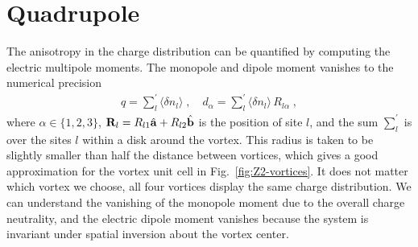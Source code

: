 






\section{Quadrupole}

The anisotropy in the charge distribution can be quantified by computing the electric multipole moments.
The monopole and dipole moment vanishes to the numerical precision
\begin{eqnarray}
    q= \sum_{l}^\prime \langle \delta n_l\rangle \; , \quad
    d_\alpha =  \sum_{l}^\prime \langle \delta n_l\rangle \, {R}_{l\alpha} \;  ,
\end{eqnarray}
where $\alpha\in \{1,2,3\}$, $\mathbf R_l= R_{l1}\hat{\mathbf a}+R_{l2}\hat{\mathbf b}$ is the position of site $l$, and the sum $\sum_{l}^\prime$ is over the sites $l$ within a disk around the vortex. This radius is taken to be slightly smaller than half the distance between vortices, which gives a good approximation for the vortex unit cell in Fig.~\ref{fig:Z2-vortices}.
It does not matter which vortex we choose, all four vortices display the same charge distribution.
We can understand the vanishing of the monopole moment due to the overall charge neutrality, and the electric dipole moment vanishes because the system is invariant under spatial inversion about the vortex center.

